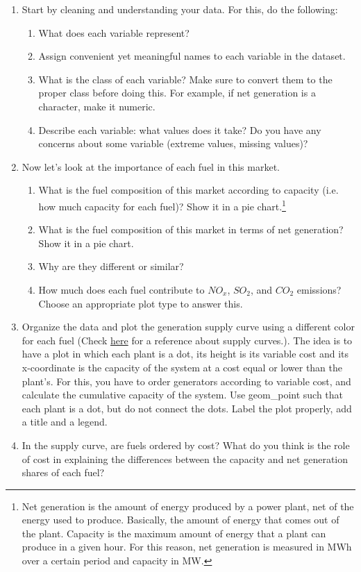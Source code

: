 \documentclass[11pt]{article}
\begin{document}
\begin{enumerate}

\item
	Start by cleaning and understanding your data.
	For this, do the following:
	\begin{enumerate}
	\item What does each variable represent?
	\item Assign convenient yet meaningful names to each variable in the dataset.
	\item What is the class of each variable? Make sure to convert them to the proper class before doing this. For example, if net generation is a character, make it numeric.
	\item Describe each variable: what values does it take? Do you have any concerns about some variable (extreme values, missing values)?
	\end{enumerate}
 
	\item Now let's look at the importance of each fuel in this market. 
		\begin{enumerate}
		\item What is the fuel composition of this market according to capacity (i.e. how much capacity for each fuel)? Show it in a pie chart.\footnote{Net generation is the amount of energy produced by a power plant, net of the energy used to produce. Basically, the amount of energy that comes out of the plant. Capacity is the maximum amount of energy  that a plant can produce in a given hour. For this reason, net generation is measured in MWh over a certain period and capacity in MW.}

		\item What is the fuel composition of this market in terms of net generation? Show it in a pie chart.
		\item Why are they different or similar?
		\item How much does each fuel contribute to $NO_x$, $SO_2$, and $CO_2$ emissions? Choose an appropriate plot type to answer this.
		\end{enumerate}

\item Organize the data and plot the generation supply curve using a different color for each fuel (Check \href{https://www.eia.gov/todayinenergy/detail.php?id=7590}{here} for a reference about supply curves.). The idea is to have a plot in which each plant is a dot, its height is its variable cost and its x-coordinate is the capacity of the system at a cost equal or lower than the plant's. For this, you have to order generators according to variable cost, and calculate the cumulative capacity of the system. Use geom\_point such that each plant is a dot, but do not connect the dots. Label the plot properly, add a title and a legend.
\item In the supply curve, are fuels ordered by cost? What do you think is the role of cost in explaining the differences between the capacity and net generation shares of each fuel?
	

\end{enumerate}
\end{document}
